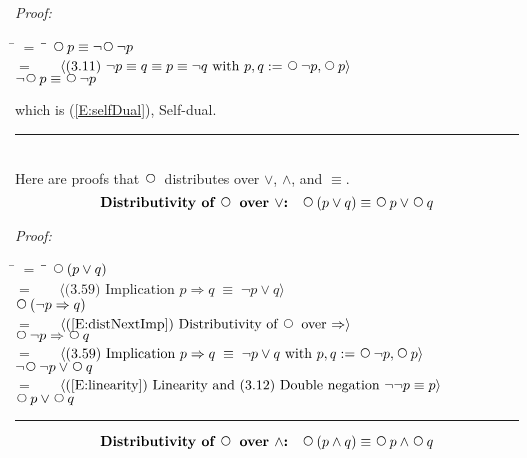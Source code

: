 \documentclass[fleqn, leqno]{article}
\newcommand{\lgap}{2pt}                             %
\newcommand{\mymathindent}{24pt}                    %
\newcommand{\equivs}{\ensuremath{\;\equiv\;}}       %
\newcommand{\impl}{\ensuremath{\Rightarrow}}        %
\newcommand{\Next}{\;\,\text{\raisebox{3.5pt}{\circle{6}}}}
\newcommand{\myqed}{\rule[-.23ex]{1.2ex}{2.0ex}}
\newcommand{\myqedtab}{\hspace{388.5pt}}              %
\newcommand{\Gll} {\langle}                         %
\newcommand{\Ggg} {\rangle}                         %
\newcommand{\Hint}[1]     {\ \ \ $\Gll              \mbox{#1} \Ggg$ }   %
\begin{document}
\emph{Proof:}
\begin{tabbing}
\hspace{\mymathindent} \= $= \;$ \= \myqedtab \= \kill
  \> \>   $\Next p \equiv \neg\Next\neg p$\\[\lgap]
  \> $=$  \>  \Hint{(3.11) $\neg p \equiv q \equiv p \equiv \neg q$ with $p,q := \Next\neg p, \Next p$} \\[\lgap]
  \> \>   $\neg\Next p \equiv \Next\neg p$
\end{tabbing}
which is (\ref{E:selfDual}), Self-dual. \hfill \myqed\\[\lgap]

Here are proofs that $\Next$ distributes over $\lor$, $\land$, and $\equiv$.
\begin{equation}\label{E:distNextOr}
\textbf{Distributivity of $\Next$ over $\lor$:}\quad \Next (p \lor q) \equiv \Next p \lor \Next q
\end{equation}

\emph{Proof:}
\begin{tabbing}
\hspace{\mymathindent} \= $= \;$ \= \myqedtab \= \kill
	\> \>   $\Next(p \lor q)$\\[\lgap]
	\> $=$  \>  \Hint{(3.59) Implication $p\impl q \equivs \neg p \lor q$}\\[\lgap]
	\> \>   $\Next(\neg p \impl q)$\\[\lgap]
	\> $=$  \>  \Hint{(\ref{E:distNextImp}) Distributivity of $\Next$ over $\impl$}\\[\lgap]
	\> \>   $\Next\neg p \impl \Next q$\\[\lgap]
	\> $=$  \>  \Hint{(3.59) Implication $p\impl q \equivs \neg p \lor q$ with $p,q := \Next\neg p, \Next p$}\\[\lgap]
	\> \>   $\neg\Next\neg p \lor \Next q$\\[\lgap]
	\> $=$  \>  \Hint{(\ref{E:linearity}) Linearity and (3.12) Double negation $\neg\neg p\equiv p$}\\[\lgap]
	\> \>   $\Next p \lor \Next q$ \> \myqed
\end{tabbing}

\begin{equation}\label{E:distNextAnd}
\textbf{Distributivity of $\Next$ over $\land$:}\quad \Next (p \land q) \equiv \Next p \land \Next q
\end{equation}
\end{document}
